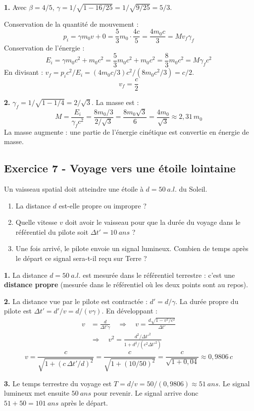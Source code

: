 \documentclass[12pt,a4paper]{article}
\begin{document}
\begin{boitecorrige}
\textbf{1.} Avec $\beta = 4/5$, $\gamma = 1/\sqrt{1-16/25} = 1/\sqrt{9/25} = 5/3$.

Conservation de la quantité de mouvement :
\[
p_i = \gamma m_0 v + 0 = \frac{5}{3}m_0\cdot\frac{4c}{5} = \frac{4m_0c}{3} = Mv_f\gamma_f
\]
Conservation de l'énergie :
\[
E_i = \gamma m_0c^2 + m_0c^2 = \frac{5}{3}m_0c^2 + m_0c^2 = \frac{8}{3}m_0c^2 = M\gamma_f c^2
\]
En divisant : $v_f = p_i c^2/E_i = (4m_0c/3)c^2/(8m_0c^2/3) = c/2$.
\[
\boxed{v_f = \frac{c}{2}}
\]

\textbf{2.} $\gamma_f = 1/\sqrt{1-1/4} = 2/\sqrt{3}$. La masse est :
\[
M = \frac{E_i}{\gamma_f c^2} = \frac{8m_0/3}{2/\sqrt{3}} = \frac{8m_0\sqrt{3}}{6} = \frac{4m_0}{\sqrt{3}} \approx 2{,}31\,m_0
\]
La masse augmente : une partie de l'énergie cinétique est convertie en énergie de masse.
\end{boitecorrige}

\subsection*{Exercice 7 - Voyage vers une étoile lointaine \niveau{\moyen}}

\begin{boiteexercice}
Un vaisseau spatial doit atteindre une étoile à $d = \qty{50}{a.l.}$ du Soleil.
\begin{enumerate}
  \item La distance $d$ est-elle propre ou impropre ?
  \item Quelle vitesse $v$ doit avoir le vaisseau pour que la durée du voyage dans le référentiel du pilote soit $\Delta t' = \qty{10}{ans}$ ?
  \item Une fois arrivé, le pilote envoie un signal lumineux. Combien de temps après le départ ce signal sera-t-il reçu sur Terre ?
\end{enumerate}
\end{boiteexercice}

\begin{boitecorrige}
\textbf{1.} La distance $d = \qty{50}{a.l.}$ est mesurée dans le référentiel terrestre : c'est une \textbf{distance propre} (mesurée dans le référentiel où les deux points sont au repos).

\textbf{2.} La distance vue par le pilote est contractée : $d' = d/\gamma$. La durée propre du pilote est $\Delta t' = d'/v = d/(v\gamma)$. En développant :
\begin{align*}
v &= \frac{d}{\Delta t'\gamma} \quad\Rightarrow\quad v = \frac{d\sqrt{1-v^2/c^2}}{\Delta t'} \\
  &\Rightarrow\quad v^2 = \frac{d^2/\Delta t'^2}{1+d^2/(c^2\Delta t'^2)}
\end{align*}
\[
v = \frac{c}{\sqrt{1+(c\,\Delta t'/d)^2}} = \frac{c}{\sqrt{1+(10/50)^2}} = \frac{c}{\sqrt{1+0{,}04}} \approx \boxed{0{,}9806\,c}
\]

\textbf{3.} Le temps terrestre du voyage est $T = d/v = 50/(0{,}9806) \approx \qty{51}{ans}$. Le signal lumineux met ensuite $\qty{50}{ans}$ pour revenir. Le signal arrive donc $51 + 50 = \boxed{\qty{101}{ans}}$ après le départ.
\end{boitecorrige}
\end{document}
